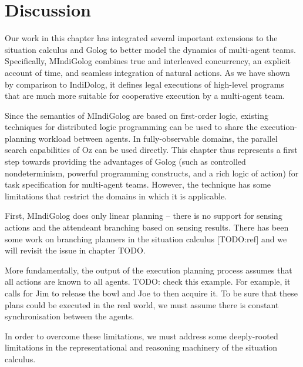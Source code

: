 \section{Discussion\label{sec:MIndiGolog:Discussion}}

Our work in this chapter has integrated several important extensions
to the situation calculus and Golog to better model the dynamics of
multi-agent teams. Specifically, MIndiGolog combines true and interleaved
concurrency, an explicit account of time, and seamless integration
of natural actions. As we have shown by comparison to IndiDolog, it
defines legal executions of high-level programs that are much more
suitable for cooperative execution by a multi-agent team.

Since the semantics of MIndiGolog are based on first-order logic,
existing techniques for distributed logic programming can be used
to share the execution-planning workload between agents. In fully-observable
domains, the parallel search capabilities of Oz can be used directly.
This chapter thus represents a first step towards providing the advantages
of Golog (such as controlled nondeterminism, powerful programming
constructs, and a rich logic of action) for task specification for
multi-agent teams. However, the technique has some limitations that
restrict the domains in which it is applicable.

First, MIndiGolog does only linear planning -- there is no support
for sensing actions and the attendeant branching based on sensing
results. There has been some work on branching planners in the situation
calculus [TODO:ref] and we will revisit the issue in chapter TODO.

More fundamentally, the output of the execution planning process assumes
that all actions are known to all agents. TODO: check this example.
For example, it calls for Jim to release the bowl and Joe to then
acquire it. To be sure that these plans could be executed in the real
world, we must assume there is constant synchronisation between the
agents.

In order to overcome these limitations, we must address some deeply-rooted
limitations in the representational and reasoning machinery of the
situation calculus.

